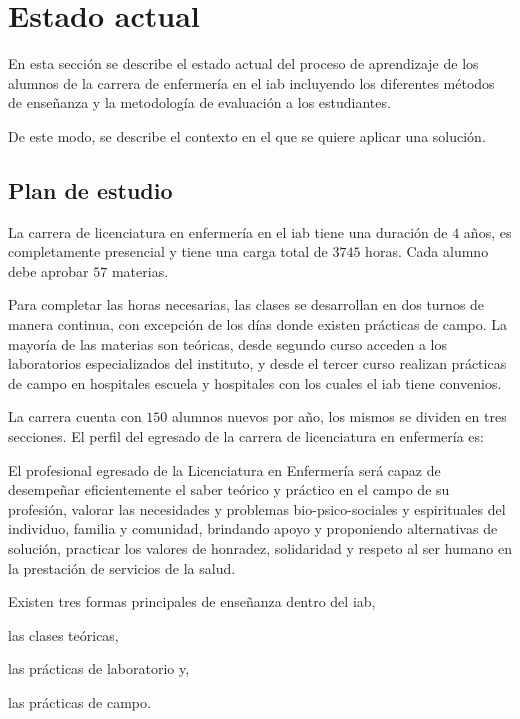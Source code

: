 
\section{Estado actual}

En esta sección se describe el estado actual del proceso de aprendizaje de los 
alumnos de la carrera de enfermería en el \Gls{iab} incluyendo los diferentes 
métodos de enseñanza y la metodología de evaluación a los estudiantes. 

De este modo, se describe el contexto en el que se quiere aplicar una 
solución.


\subsection{Plan de estudio}
\label{sec:plan_estudio}

La carrera de licenciatura en enfermería en el \Gls{iab} tiene una duración de $4$
años, es completamente presencial y tiene una carga total de $3745$
horas. Cada alumno debe aprobar $57$ materias.

Para completar las horas necesarias, las clases se desarrollan en 
dos turnos de manera continua, con excepción de los días donde existen
prácticas de campo. La mayoría de las materias son teóricas, desde segundo curso
acceden a los laboratorios especializados del instituto, y desde el tercer curso
realizan prácticas de campo en hospitales escuela y hospitales con los cuales el
\Gls{iab} tiene convenios.

La carrera cuenta con $150$ alumnos nuevos por año, los mismos se dividen en tres secciones. 
El perfil del egresado de la carrera de licenciatura en enfermería 
es\cite{iab:enfermeria}:

\begin{displayquote}

El profesional egresado de la Licenciatura en Enfermería será capaz de
desempeñar eficientemente el saber teórico y práctico en el campo de su
profesión, valorar las necesidades y problemas bio-psico-sociales y espirituales
del individuo, familia y comunidad, brindando apoyo y proponiendo alternativas
de solución, practicar los valores de honradez, solidaridad y respeto al ser
humano en la prestación de servicios de la salud.

\end{displayquote}

Existen tres formas principales de enseñanza dentro del \Gls{iab}, 
\begin{enumerate*}[label=\itshape\alph*\upshape.]
\item las clases teóricas, 
\item las prácticas de laboratorio y, 
\item las prácticas de campo.
\end{enumerate*}


